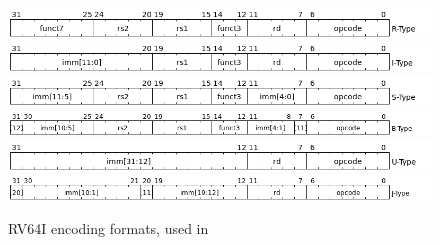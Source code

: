 \begin{figure}
    \begin{centering}
        \includegraphics[width = \textwidth]{figures/2-RiscV/R.png}\\
        \includegraphics[width = \textwidth]{figures/2-RiscV/I.png}\\
        \includegraphics[width = \textwidth]{figures/2-RiscV/S.png}\\
        \includegraphics[width = \textwidth]{figures/2-RiscV/B.png}\\
        \includegraphics[width = \textwidth]{figures/2-RiscV/U.png}\\
        \includegraphics[width = \textwidth]{figures/2-RiscV/J.png}
        \caption[RV64I encoding formats]{RV64I encoding formats, used in \cite[Chapter 2.3]{riscv-isa}}
        \label{fig:rv64i_formats}
    \end{centering}
\end{figure}
